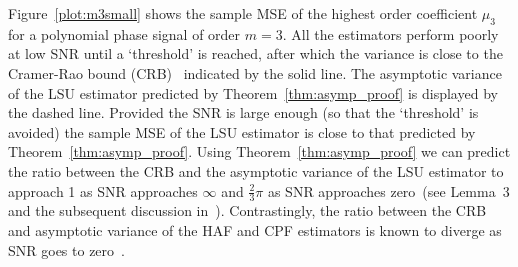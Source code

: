 \documentclass[journal]{IEEEtran}
\begin{document}
Figure~\ref{plot:m3small} shows the sample MSE of the highest order coefficient $\mu_3$ for a polynomial phase signal of order $m=3$.  All the estimators perform poorly at low SNR until a `threshold' is reached, after which the variance is close to the Cramer-Rao bound (CRB)~\cite{Peleg1991_CRB_PPS_1991} indicated by the solid line.  The asymptotic variance of the LSU estimator predicted by Theorem~\ref{thm:asymp_proof} is displayed by the dashed line.  Provided the SNR is large enough (so that the `threshold' is avoided) the sample MSE of the LSU estimator is close to that predicted by Theorem~\ref{thm:asymp_proof}.  Using Theorem~\ref{thm:asymp_proof} we can predict the ratio between the CRB and the asymptotic variance of the LSU estimator to approach 1 as SNR approaches $\infty$ and $\tfrac{2}{3}\pi$ as SNR approaches zero~(see Lemma~3 and the subsequent discussion in~\cite{Quinn2009_dasp_phase_only_information_loss}).  Contrastingly, the ratio between the CRB and asymptotic variance of the HAF and CPF estimators is known to diverge as SNR goes to zero~\cite{Porat_asympt_HAF_DPT_1996,Oshea_cpf_2004,Djurovic_haf_cpf_2012}.  %
\end{document}
